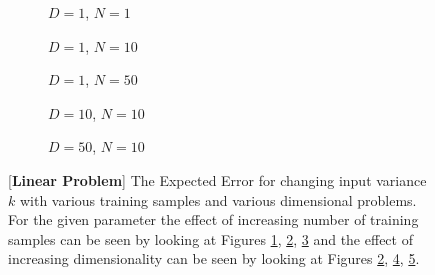 \begin{figure}[!h]
  \centering
    \begin{subfigure}{0.3\textwidth}
      \centering
      \caption{$D=1$, $N=1$}
      \label{fig:linear-b-N-1-D-1}
    \end{subfigure}
    \begin{subfigure}{0.3\textwidth}
      \centering
      \caption{$D=1$, $N=10$}
      \label{fig:linear-b-N-10-D-1}
    \end{subfigure}
    \begin{subfigure}{0.3\textwidth}
      \centering
      \caption{$D=1$, $N=50$}
      \label{fig:linear-b-N-50-D-1}
    \end{subfigure}

    \begin{subfigure}{0.3\textwidth}
      \centering
      \caption{$D=10$, $N=10$}
      \label{fig:linear-b-N-10-D-10}
    \end{subfigure}
    \begin{subfigure}{0.3\textwidth}
      \centering
      \caption{$D=50$, $N=10$}
      \label{fig:linear-b-N-10-D-50}
    \end{subfigure}  

  \caption{[\textbf{Linear Problem}] The Expected Error for changing input variance  $k$ with various training samples and various dimensional problems. For the given parameter the effect of increasing number of training samples can be seen by looking at Figures \ref{fig:linear-b-N-1-D-1}, \ref{fig:linear-b-N-10-D-1}, \ref{fig:linear-b-N-50-D-1} and the effect of increasing dimensionality can be seen by looking at Figures \ref{fig:linear-b-N-10-D-1}, \ref{fig:linear-b-N-10-D-10}, \ref{fig:linear-b-N-10-D-50}.}\label{fig:linear-b}
\end{figure}



